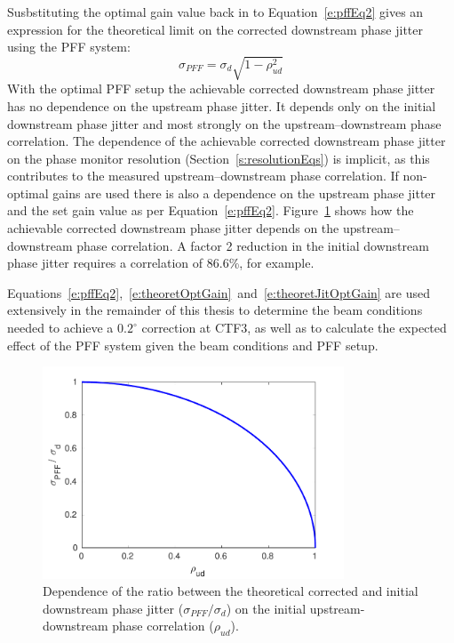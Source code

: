 Susbstituting the optimal gain value back in to Equation~\ref{e:pffEq2} gives an expression for the theoretical limit on the corrected downstream phase jitter using the PFF system:
\begin{equation}
\sigma_{PFF} = \sigma_d\sqrt{1-\rho_{ud}^2}
\label{e:theoretJitOptGain}
\end{equation}
With the optimal PFF setup the achievable corrected downstream phase jitter has no dependence on the upstream phase jitter. It depends only on the initial downstream phase jitter and most strongly on the upstream--downstream phase correlation. The dependence of the achievable corrected downstream phase jitter on the phase monitor resolution (Section~\ref{s:resolutionEqs}) is implicit, as this contributes to the measured upstream--downstream phase correlation. If non-optimal gains are used there is also a dependence on the upstream phase jitter and the set gain value as per Equation~\ref{e:pffEq2}. Figure~\ref{f:theoretJitvsCorr} shows how the achievable corrected downstream phase jitter depends on the upstream--downstream phase correlation. A factor 2 reduction in the initial downstream phase jitter requires a correlation of 86.6\%, for example.

Equations~\ref{e:pffEq2},~\ref{e:theoretOptGain}~and~\ref{e:theoretJitOptGain} are used extensively in the remainder of this thesis to determine the beam conditions needed to achieve a \(0.2^\circ\) correction at CTF3, as well as to calculate the expected effect of the PFF system given the beam conditions and PFF setup.

\begin{figure}
  \centering
  \includegraphics[width=0.8\textwidth]{Figures/propagation/theoretJitvsCorr}
  \caption{Dependence of the ratio between the theoretical corrected and initial downstream phase jitter (\(\sigma_{PFF}/\sigma_d\)) on the initial upstream-downstream phase correlation (\(\rho_{ud}\)).}
  \label{f:theoretJitvsCorr}
\end{figure}

